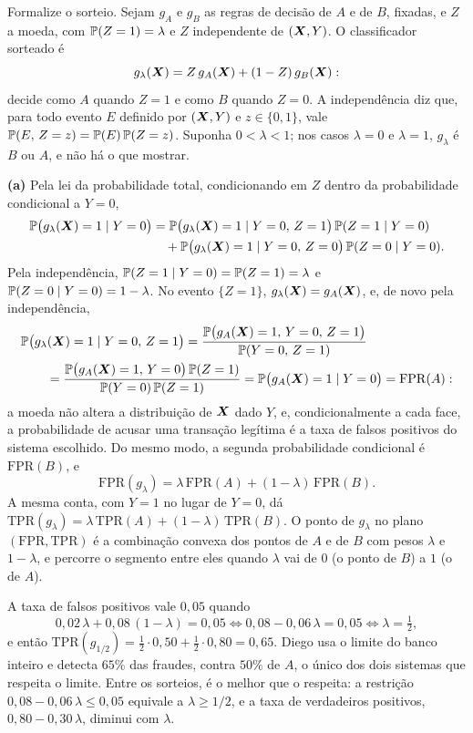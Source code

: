 \begin{solucao}
Formalize o sorteio. Sejam $g_A$ e $g_B$ as regras de decisão de $A$ e de $B$, fixadas, e $Z$
a moeda, com $\mathbb{P}(Z=1)=\lambda$ e $Z$ independente de $(\bm{X},Y)$. O classificador sorteado é
\[
  g_\lambda(\bm{X})=Z\,g_A(\bm{X})+(1-Z)\,g_B(\bm{X}):
\]
decide como $A$ quando $Z=1$ e como $B$ quando $Z=0$. A independência diz que, para todo
evento $E$ definido por $(\bm{X},Y)$ e $z\in\{0,1\}$, vale $\mathbb{P}(E,\,Z=z)=\mathbb{P}(E)\,\mathbb{P}(Z=z)$.
Suponha $0<\lambda<1$; nos casos $\lambda=0$ e $\lambda=1$, $g_\lambda$ é $B$ ou $A$, e não há
o que mostrar.

\smallskip
\textbf{(a)} Pela lei da probabilidade total, condicionando em $Z$ dentro da probabilidade
condicional a $Y=0$,
\begin{align*}
  \mathbb{P}\big(g_\lambda(\bm{X})=1\mid Y=0\big)
  &=\mathbb{P}\big(g_\lambda(\bm{X})=1\mid Y=0,\,Z=1\big)\,\mathbb{P}(Z=1\mid Y=0)\\
  &\quad+\mathbb{P}\big(g_\lambda(\bm{X})=1\mid Y=0,\,Z=0\big)\,\mathbb{P}(Z=0\mid Y=0).
\end{align*}
Pela independência, $\mathbb{P}(Z=1\mid Y=0)=\mathbb{P}(Z=1)=\lambda$ e $\mathbb{P}(Z=0\mid Y=0)=1-\lambda$. No
evento $\{Z=1\}$, $g_\lambda(\bm{X})=g_A(\bm{X})$, e, de novo pela independência,
\begin{align*}
  &\mathbb{P}\big(g_\lambda(\bm{X})=1\mid Y=0,\,Z=1\big)
   =\frac{\mathbb{P}\big(g_A(\bm{X})=1,\,Y=0,\,Z=1\big)}{\mathbb{P}(Y=0,\,Z=1)}\\
  &\qquad=\frac{\mathbb{P}\big(g_A(\bm{X})=1,\,Y=0\big)\,\mathbb{P}(Z=1)}{\mathbb{P}(Y=0)\,\mathbb{P}(Z=1)}
   =\mathbb{P}\big(g_A(\bm{X})=1\mid Y=0\big)=\mathrm{FPR}(A):
\end{align*}
a moeda não altera a distribuição de $\bm{X}$ dado $Y$, e, condicionalmente a cada face, a
probabilidade de acusar uma transação legítima é a taxa de falsos positivos do sistema
escolhido. Do mesmo modo, a segunda probabilidade condicional é $\mathrm{FPR}(B)$, e
\[
  \mathrm{FPR}(g_\lambda)=\lambda\,\mathrm{FPR}(A)+(1-\lambda)\,\mathrm{FPR}(B).
\]
A mesma conta, com $Y=1$ no lugar de $Y=0$, dá
$\mathrm{TPR}(g_\lambda)=\lambda\,\mathrm{TPR}(A)+(1-\lambda)\,\mathrm{TPR}(B)$. O ponto de
$g_\lambda$ no plano $(\mathrm{FPR},\mathrm{TPR})$ é a combinação convexa dos pontos de $A$ e de
$B$ com pesos $\lambda$ e $1-\lambda$, e percorre o segmento entre eles quando $\lambda$ vai de
$0$ (o ponto de $B$) a $1$ (o de $A$).

A taxa de falsos positivos vale $0{,}05$ quando
\[
  0{,}02\,\lambda+0{,}08\,(1-\lambda)=0{,}05\iff 0{,}08-0{,}06\,\lambda=0{,}05
  \iff\lambda=\tfrac12 ,
\]
e então $\mathrm{TPR}(g_{1/2})=\tfrac12\cdot0{,}50+\tfrac12\cdot0{,}80=0{,}65$. Diego usa o
limite do banco inteiro e detecta $65\%$ das fraudes, contra $50\%$ de $A$, o único dos dois
sistemas que respeita o limite. Entre os sorteios, é o melhor que o respeita: a restrição
$0{,}08-0{,}06\,\lambda\le0{,}05$ equivale a $\lambda\ge1/2$, e a taxa de verdadeiros
positivos, $0{,}80-0{,}30\,\lambda$, diminui com $\lambda$.


\end{solucao}
